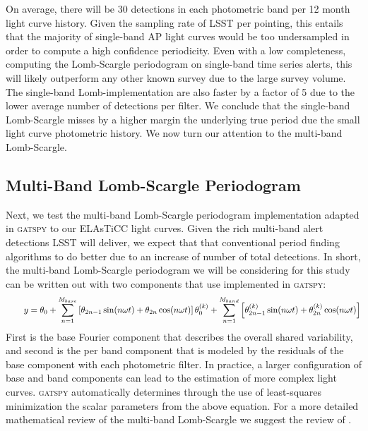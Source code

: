 \documentclass[DM,authoryear,toc]{lsstdoc}
\begin{document}
On average, there will be 30 detections in each photometric band per 12 month light curve history. Given the sampling rate of LSST per pointing, this entails that the majority of single-band AP light curves would be too undersampled in order to compute a high confidence periodicity. Even with a low completeness, computing the Lomb-Scargle periodogram on single-band time series alerts, this will likely outperform any other known survey due to the large survey volume. The single-band Lomb-implementation are also faster by a factor of 5 due to the lower average number of detections per filter. We conclude that the single-band Lomb-Scargle misses by a higher margin the underlying true period due the small light curve photometric history. We now turn our attention to the multi-band Lomb-Scargle.

\subsection{Multi-Band Lomb-Scargle Periodogram}
Next, we test the multi-band Lomb-Scargle periodogram implementation adapted in \textsc{gatspy} to our ELAsTiCC light curves. Given the rich multi-band alert detections LSST will deliver, we expect that that conventional period finding algorithms to do better due to an increase of number of total detections. In short, the multi-band Lomb-Scargle periodogram we will be considering for this study can be written out with two components that use implemented in \textsc{gatspy}:
\smallbreak{}
\begin{equation}
\qquad y = \theta_0+\sum_{n=1}^{M_{base}}\left[\theta_{2 n-1} \sin (n \omega t)+\theta_{2 n} \cos (n \omega t)\right] \\
\theta_0^{(k)}+\sum_{n=1}^{M _{band}}\left[\theta_{2 n-1}^{(k)} \sin (n \omega t)+\theta_{2 n}^{(k)} \cos (n \omega t)\right]
\end{equation}
\smallbreak{}
First is the base Fourier component that describes the overall shared variability, and second is the per band component that is modeled by the residuals of the base component with each photometric filter. In practice, a larger configuration of base and band components can lead to the estimation of more complex light curves. \textsc{gatspy} automatically determines through the use of least-squares minimization the scalar parameters from the above equation. For a more detailed mathematical review of the multi-band Lomb-Scargle we suggest the review of \citet{VanderPlas:VP2015}. 
\end{document}
